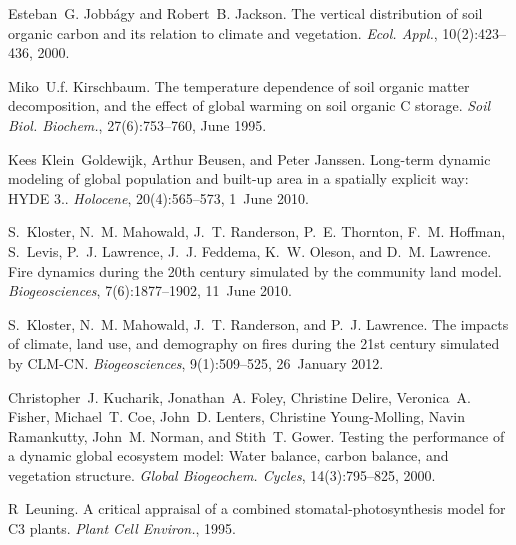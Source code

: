 \begin{DoxyDescription}
\item[\label{_CITEREF_Jobbagy2000-pa}%
\mbox{[}25\mbox{]}]Esteban~G. Jobbágy and Robert~B. Jackson. The vertical distribution of soil organic carbon and its relation to climate and vegetation. {\itshape Ecol. Appl.}, 10(2)\+:423--436, 2000. 


\item[\label{_CITEREF_Kirschbaum1995-db}%
\mbox{[}26\mbox{]}]Miko~U.\+f. Kirschbaum. The temperature dependence of soil organic matter decomposition, and the effect of global warming on soil organic C storage. {\itshape Soil Biol. Biochem.}, 27(6)\+:753--760, June 1995. 


\item[\label{_CITEREF_Klein_Goldewijk2010-lh}%
\mbox{[}27\mbox{]}]Kees Klein~Goldewijk, Arthur Beusen, and Peter Janssen. Long-\/term dynamic modeling of global population and built-\/up area in a spatially explicit way\+: H\+Y\+D\+E 3.. {\itshape Holocene}, 20(4)\+:565--573, 1~June 2010. 


\item[\label{_CITEREF_Kloster2010-633}%
\mbox{[}28\mbox{]}]S.~Kloster, N.~M. Mahowald, J.~T. Randerson, P.~E. Thornton, F.~M. Hoffman, S.~Levis, P.~J. Lawrence, J.~J. Feddema, K.~W. Oleson, and D.~M. Lawrence. Fire dynamics during the 20th century simulated by the community land model. {\itshape Biogeosciences}, 7(6)\+:1877--1902, 11~June 2010. 


\item[\label{_CITEREF_Kloster2012-c79}%
\mbox{[}29\mbox{]}]S.~Kloster, N.~M. Mahowald, J.~T. Randerson, and P.~J. Lawrence. The impacts of climate, land use, and demography on fires during the 21st century simulated by C\+L\+M-\/\+C\+N. {\itshape Biogeosciences}, 9(1)\+:509--525, 26~January 2012. 


\item[\label{_CITEREF_Kucharik2000-xk}%
\mbox{[}30\mbox{]}]Christopher~J. Kucharik, Jonathan~A. Foley, Christine Delire, Veronica~A. Fisher, Michael~T. Coe, John~D. Lenters, Christine Young-\/\+Molling, Navin Ramankutty, John~M. Norman, and Stith~T. Gower. Testing the performance of a dynamic global ecosystem model\+: Water balance, carbon balance, and vegetation structure. {\itshape Global Biogeochem. Cycles}, 14(3)\+:795--825, 2000. 


\item[\label{_CITEREF_Leuning1995-ab}%
\mbox{[}31\mbox{]}]R~Leuning. A critical appraisal of a combined stomatal-\/photosynthesis model for C3 plants. {\itshape Plant Cell Environ.}, 1995.



\end{DoxyDescription}
